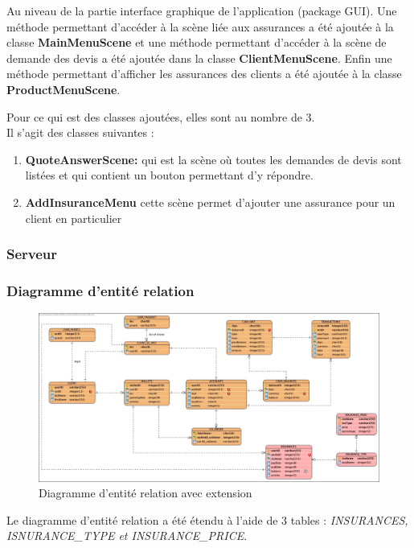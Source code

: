 \documentclass[../rapport.tex]{subfiles}
\begin{document}
		\bigskip

		Au niveau de la partie interface graphique de l'application (package GUI). Une méthode 
		permettant d'accéder à la scène liée aux assurances a été ajoutée à la classe 
		\textbf{MainMenuScene} et une méthode permettant d'accéder à la scène de demande des devis
		a été ajoutée dans la classe \textbf{ClientMenuScene}. Enfin une méthode permettant 
		d'afficher les assurances des clients a été ajoutée à la classe \textbf{ProductMenuScene}.

		\medskip

		Pour ce qui est des classes ajoutées, elles sont au nombre de 3.\\
		Il s'agit des classes suivantes :
		\begin{enumerate}
				\item \textbf{QuoteAnswerScene:} qui est la scène où toutes les demandes de devis
						sont listées et qui contient un bouton permettant d'y répondre.
				\item \textbf{AddInsuranceMenu} cette scène permet d'ajouter une assurance pour
						un client en particulier
		\end{enumerate} 
\newpage

		\subsubsection{Serveur}
		\subsubsection{Diagramme d'entité relation}

				\begin{figure}[h]
						\centering\includegraphics[scale=0.25]{ressources/photos_diagrammes/extensionThomas/erdThomas.jpg}
						\caption{Diagramme d'entité relation avec extension}
				\end{figure}
		Le diagramme d'entité relation a été étendu à l'aide de 3 tables : \textit{INSURANCES, ISNURANCE\_TYPE et INSURANCE\_PRICE}.
				
\end{document}
